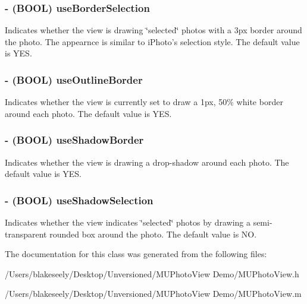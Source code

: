 \subsubsection{\setlength{\rightskip}{0pt plus 5cm}- (BOOL) use\-Border\-Selection }\label{interface_m_u_photo_view_713e0c5b20ed70e405614b8b8702b26b}


Indicates whether the view is drawing \char`\"{}selected\char`\"{} photos with a 3px border around the photo. The appearnce is similar to i\-Photo's selection style. The default value is YES. 
\subsubsection{\setlength{\rightskip}{0pt plus 5cm}- (BOOL) use\-Outline\-Border }\label{interface_m_u_photo_view_2c28bd9d281167b75d75824910b75107}


Indicates whether the view is currently set to draw a 1px, 50\% white border around each photo. The default value is YES. 
\subsubsection{\setlength{\rightskip}{0pt plus 5cm}- (BOOL) use\-Shadow\-Border }\label{interface_m_u_photo_view_330e1922d4c3045a40d6ab8df4f659fd}


Indicates whether the view is drawing a drop-shadow around each photo. The default value is YES. 
\subsubsection{\setlength{\rightskip}{0pt plus 5cm}- (BOOL) use\-Shadow\-Selection }\label{interface_m_u_photo_view_919b33544e2380270e1304042df3b1e0}


Indicates whether the view indicates \char`\"{}selected\char`\"{} photos by drawing a semi-transparent rounded box around the photo. The default value is NO. 

The documentation for this class was generated from the following files:\begin{CompactItemize}
\item 
/Users/blakeseely/Desktop/Unversioned/MUPhoto\-View Demo/MUPhoto\-View.h\item 
/Users/blakeseely/Desktop/Unversioned/MUPhoto\-View Demo/MUPhoto\-View.m\end{CompactItemize}
